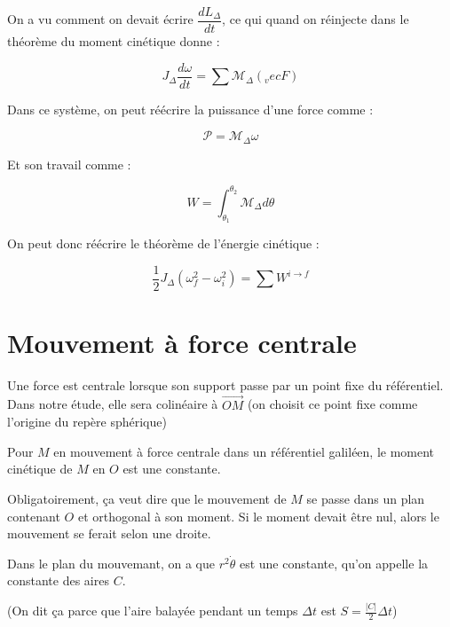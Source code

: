 \documentclass[a4paper,12pt]{book}
\newcommand{\Def}[2]{\begin{tcolorbox}[colback=white,colframe=red!10!green!20!blue!75!, title=Définition : #1]#2\end{tcolorbox}}
\newcommand{\Thr}[2]{\begin{tcolorbox}[sharp corners, colback=white,colframe=red!10!blue!30!green!75!, title=Théorème : #1]#2\end{tcolorbox}}
\begin{document}
\Thr{Théorème du moment cinétique}{On a vu comment on devait écrire $\dfrac{dL_\Delta}{dt}$, ce qui quand on réinjecte dans le théorème du moment cinétique donne :
\par $$J_\Delta\dfrac{d\omega}{dt} = \sum\mathcal{M}_\Delta(_vec{F})$$}
\Def{Grandeurs associées à une force}{Dans ce système, on peut réécrire la puissance d'une force comme :
\par $$\mathcal{P} =\mathcal{M}_\Delta\omega$$
\par Et son travail comme :
\par $$W = \int_{\theta_1}^{\theta_2}\mathcal{M}_\Delta d\theta$$}
\Thr{Théorème de l'énergie cinétique}{On peut donc réécrire le théorème de l'énergie cinétique :
\par $$\frac{1}{2}J_\Delta(\omega_f^2-\omega_i^2) = \sum W^{i\to f}$$}

\section{Mouvement à force centrale}
Une force est centrale lorsque son support passe par un point fixe du référentiel. Dans notre étude, elle sera colinéaire à $\vec{OM}$ (on choisit ce point fixe comme l'origine du repère sphérique)
\Thr{Conversation du moment cinétique}{Pour $M$ en mouvement à force centrale dans un référentiel galiléen, le moment cinétique de $M$ en $O$ est une constante.
\par Obligatoirement, ça veut dire que le mouvement de $M$ se passe dans un plan contenant $O$ et orthogonal à son moment. Si le moment devait être nul, alors le mouvement se ferait selon une droite.
\par Dans le plan du mouvemant, on a que $r^2\dot{\theta}$ est une constante, qu'on appelle la constante des aires $C$.
\par (On dit ça parce que l'aire balayée pendant un temps $\Delta t$ est $S = \frac{\vert C\vert}{2}\Delta t$)}


\newpage
\end{document}

